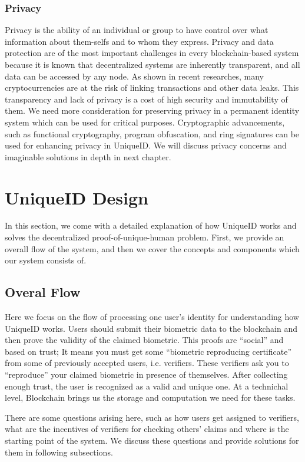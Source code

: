 \documentclass[conference]{IEEEtran}
\begin{document}
\subsubsection{Privacy}
Privacy is the ability of an individual or group to have control over what information about them-selfs and to whom they express. 
Privacy and data protection are of the most important challenges in every blockchain-based system because it is known that decentralized systems are inherently transparent, and all data can be accessed by any node. As shown in recent researches, many cryptocurrencies are at the risk of linking transactions and other data leaks. This transparency and lack of privacy is a cost of high security and immutability of them. We need more consideration for preserving privacy in a permanent identity system which can be used for critical purposes. Cryptographic advancements, such as functional cryptography, program obfuscation, and ring signatures can be used for enhancing privacy in UniqueID. We will discuss privacy concerns and imaginable solutions in depth in next chapter.


\section{UniqueID Design}
In this section, we come with a detailed explanation of how UniqueID works and solves the decentralized proof-of-unique-human problem. First, we provide an overall flow of the system, and then we cover the concepts and components which our system consists of.

\subsection{Overal Flow}

Here we focus on the flow of processing one user's identity for understanding how UniqueID works.  Users should submit their biometric data to the blockchain and then prove the validity of the claimed biometric. This proofs are “social” and based on trust; It means you must get some “biometric reproducing certificate” from some of previously accepted users, i.e. verifiers. These verifiers ask you to “reproduce” your claimed biometric in presence of themselves. After collecting enough trust, the user is recognized as a valid and unique one. At a technichal level, Blockchain brings us the storage and computation we need for these tasks.


There are some questions arising here, such as how users get assigned to verifiers, what are the incentives of verifiers for checking others' claims and where is the starting point of the system. We discuss these questions and provide solutions for them in following subsections.
\end{document}
